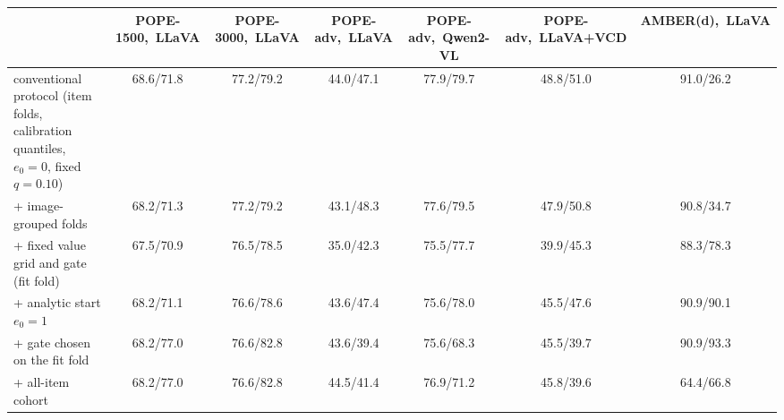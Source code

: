 \begin{tabular}{lcccccc}
\toprule
 & POPE-1500,\ LLaVA & POPE-3000,\ LLaVA & POPE-adv,\ LLaVA & POPE-adv,\ Qwen2-VL & POPE-adv,\ LLaVA+VCD & AMBER(d),\ LLaVA\\
\midrule
conventional protocol (item folds, calibration quantiles, $e_0{=}0$, fixed $q{=}0.10$) & 68.6/71.8 & 77.2/79.2 & 44.0/47.1 & 77.9/79.7 & 48.8/51.0 & 91.0/26.2\\
+ image-grouped folds & 68.2/71.3 & 77.2/79.2 & 43.1/48.3 & 77.6/79.5 & 47.9/50.8 & 90.8/34.7\\
+ fixed value grid and gate (fit fold) & 67.5/70.9 & 76.5/78.5 & 35.0/42.3 & 75.5/77.7 & 39.9/45.3 & 88.3/78.3\\
+ analytic start $e_0{=}1$ & 68.2/71.1 & 76.6/78.6 & 43.6/47.4 & 75.6/78.0 & 45.5/47.6 & 90.9/90.1\\
+ gate chosen on the fit fold & 68.2/77.0 & 76.6/82.8 & 43.6/39.4 & 75.6/68.3 & 45.5/39.7 & 90.9/93.3\\
+ all-item cohort & 68.2/77.0 & 76.6/82.8 & 44.5/41.4 & 76.9/71.2 & 45.8/39.6 & 64.4/66.8\\
\bottomrule
\end{tabular}

